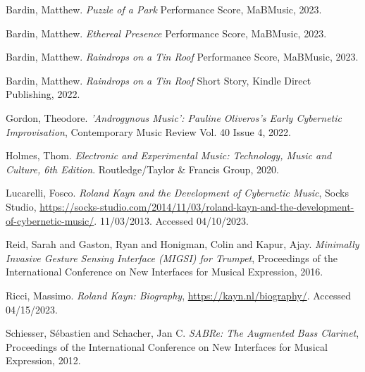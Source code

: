 

\backmatter


\begin{thebibliography}{99}

 Bardin, Matthew. \emph{Puzzle of a Park} Performance Score, MaBMusic, 2023.

 Bardin, Matthew. \emph{Ethereal Presence} Performance Score, MaBMusic, 2023.

 Bardin, Matthew. \emph{Raindrops on a Tin Roof} Performance Score, MaBMusic, 2023.

 Bardin, Matthew. \emph{Raindrops on a Tin Roof} Short Story, Kindle Direct Publishing, 2022.

 Gordon, Theodore. \emph{'Androgynous Music': Pauline Oliveros's Early Cybernetic Improvisation}, Contemporary Music Review Vol. 40 Issue 4, 2022.

 Holmes, Thom. \emph{Electronic and Experimental Music: Technology, Music and Culture, 6th Edition}. Routledge/Taylor \& Francis Group, 2020. 

 Lucarelli, Fosco. \emph{Roland Kayn and the Development of Cybernetic Music}, Socks Studio, \url{https://socks-studio.com/2014/11/03/roland-kayn-and-the-development-of-cybernetic-music/}. 11/03/2013. Accessed 04/10/2023.

 Reid, Sarah and Gaston, Ryan and Honigman, Colin and Kapur, Ajay. \emph{Minimally Invasive Gesture Sensing Interface (MIGSI) for Trumpet}, Proceedings of the International Conference on New Interfaces for Musical Expression, 2016.

 Ricci, Massimo. \emph{Roland Kayn: Biography}, \url{https://kayn.nl/biography/}. Accessed 04/15/2023.

 Schiesser, S{\'e}bastien and Schacher, Jan C. \emph{SABRe: The Augmented Bass Clarinet}, Proceedings of the International Conference on New Interfaces for Musical Expression, 2012.


\end{thebibliography}
